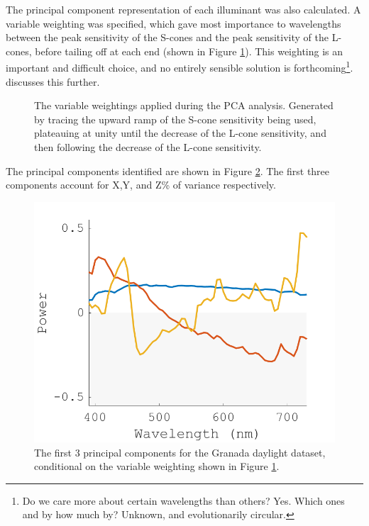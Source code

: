 The principal component representation of each illuminant was also calculated. A variable weighting was specified, which gave most importance to wavelengths between the peak sensitivity of the S-cones and the peak sensitivity of the L-cones, before tailing off at each end (shown in Figure \ref{fig:VW}). This weighting is an important and difficult choice, and no entirely sensible solution is forthcoming\footnote{Do we care more about certain wavelengths than others? Yes. Which ones and by how much by? Unknown, and evolutionarily circular.}. \citet{maloney_evaluation_1986} discusses this further. %

\begin{figure}[htbp]
 \caption{The variable weightings applied during the \gls{PCA} analysis. Generated by tracing the upward ramp of the S-cone sensitivity being used, plateauing at unity until the decrease of the L-cone sensitivity, and then following the decrease of the L-cone sensitivity.}
 \label{fig:VW}
\end{figure} 

The principal components identified are shown in Figure \ref{fig:PCA}. The first three components account for X,Y, and Z\% of variance respectively. %

\begin{figure}[htbp]
 \includegraphics[max width=\textwidth]{figs/comp/melcomp_3/8.png} %
 \caption{The first 3 principal components for the Granada daylight dataset, conditional on the variable weighting shown in Figure \ref{fig:VW}.}
 \label{fig:PCA}
\end{figure} 

